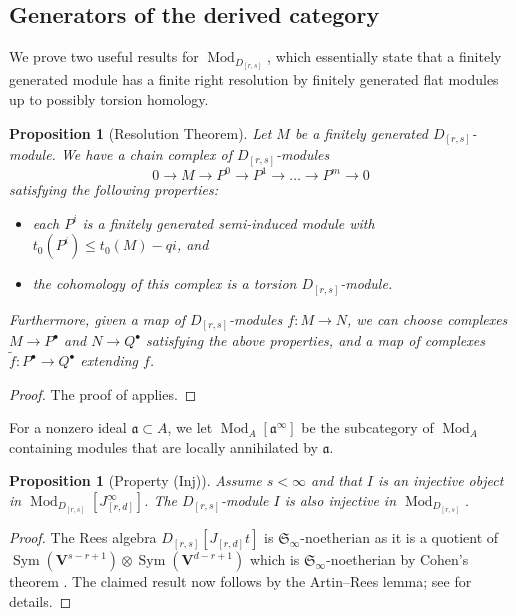 \documentclass[12pt]{amsart}
\newcommand{\fS}{\mathfrak{S}}
\newcommand{\bV}{\mathbf{V}}
\newcommand{\fa}{\mathfrak{a}}
\DeclareMathOperator{\Sym}{Sym}
\DeclareMathOperator{\Mod}{Mod}
\newcommand{\Drs}{D_{[r,s]}}
\newcommand{\Jrd}{J_{[r,d]}}
\numberwithin{equation}{section}
\newtheorem{proposition}[equation]{Proposition}
\theoremstyle{definition}
\theoremstyle{plain}
\begin{document}
\subsection{Generators of the derived category}\label{ss:gensdbDrs}
We prove two useful results for $\Mod_{\Drs}$, which essentially state that a finitely generated module has a finite right resolution by finitely generated flat modules up to possibly torsion homology.

\begin{proposition}[Resolution Theorem]\label{prop:resolutionDrs}
Let $M$ be a finitely generated $\Drs$-module. We have a chain complex of $\Drs$-modules
\begin{displaymath}
0 \to M \to P^0 \to P^1 \to \ldots \to P^m \to 0
\end{displaymath}
satisfying the following properties:
\begin{itemize}
\item each $P^i$ is a finitely generated semi-induced module with $t_0(P^i) \le t_0(M) - qi$, and
\item the cohomology of this complex is a torsion $\Drs$-module.
\end{itemize}
{Furthermore, given a map of $\Drs$-modules $f \colon M \to N$, we can choose complexes $M \to P^{\bullet}$ and $N \to Q^{\bullet}$ satisfying the above properties, and a map of complexes $\tilde{f}\colon P^{\bullet} \to Q^{\bullet}$ extending $f$.}
\end{proposition}
\begin{proof}
The proof of \cite[Theorem~5.1]{gan22ext} applies. 
\end{proof}


For a nonzero ideal $\fa \subset A$, we let $\Mod_A[\fa^{\infty}]$ be the subcategory of $\Mod_A$ containing modules that are locally annihilated by $\fa$. 
\begin{proposition}[Property (Inj)]\label{prop:propinj}
    Assume $s < \infty$ and that $I$ is an injective object in $\Mod_{\Drs}[\Jrd^{\infty}]$. The $\Drs$-module $I$ is also injective in $\Mod_{\Drs}$.
\end{proposition}
\begin{proof}
The Rees algebra $\Drs[\Jrd t]$ is $\fS_{\infty}$-noetherian as it is a quotient of $\Sym(\bV^{s-r+1}) \otimes \Sym(\bV^{d-r+1})$ which is $\fS_{\infty}$-noetherian by Cohen's theorem \cite{co67laws}. The claimed result now follows by the Artin--Rees lemma; see \cite[Section~4.4]{ss19gl2} for details.
\end{proof}
\end{document}
